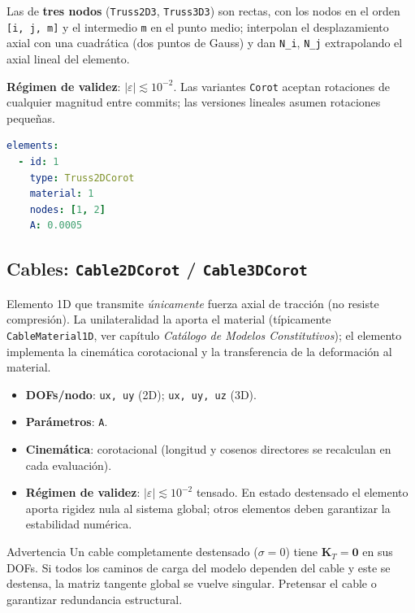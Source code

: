 \documentclass[11pt,oneside]{report}
\begin{document}
Las de \textbf{tres nodos} (\texttt{Truss2D3}, \texttt{Truss3D3}) son rectas, con los nodos en el orden \texttt{[i, j, m]} y el intermedio \texttt{m} en el punto medio; interpolan el desplazamiento axial con una cuadrática (dos puntos de Gauss) y dan \texttt{N\_i}, \texttt{N\_j} extrapolando el axial lineal del elemento.

\textbf{Régimen de validez}: $|\varepsilon| \lesssim 10^{-2}$. Las variantes \texttt{Corot} aceptan rotaciones de cualquier magnitud entre commits; las versiones lineales asumen rotaciones pequeñas.

\begin{lstlisting}[language=yaml]
elements:
  - id: 1
    type: Truss2DCorot
    material: 1
    nodes: [1, 2]
    A: 0.0005

\end{lstlisting}

\subsection{Cables: \texttt{Cable2DCorot} / \texttt{Cable3DCorot}}

Elemento 1D que transmite \textit{únicamente} fuerza axial de tracción (no resiste compresión). La unilateralidad la aporta el material (típicamente \texttt{CableMaterial1D}, ver capítulo \textit{Catálogo de Modelos Constitutivos}); el elemento implementa la cinemática corotacional y la transferencia de la deformación al material.

\begin{itemize}
  \item \textbf{DOFs/nodo}: \texttt{ux, uy} (2D); \texttt{ux, uy, uz} (3D).
  \item \textbf{Parámetros}: \texttt{A}.
  \item \textbf{Cinemática}: corotacional (longitud y cosenos directores se recalculan en cada evaluación).
  \item \textbf{Régimen de validez}: $|\varepsilon| \lesssim 10^{-2}$ tensado. En estado destensado el elemento aporta rigidez nula al sistema global; otros elementos deben garantizar la estabilidad numérica.
\end{itemize}

\begin{warnbox}{Advertencia}
Un cable completamente destensado ($\sigma = 0$) tiene $\mathbf K_T = \mathbf 0$ en sus DOFs. Si todos los caminos de carga del modelo dependen del cable y este se destensa, la matriz tangente global se vuelve singular. Pretensar el cable o garantizar redundancia estructural.
\end{warnbox}
\end{document}
